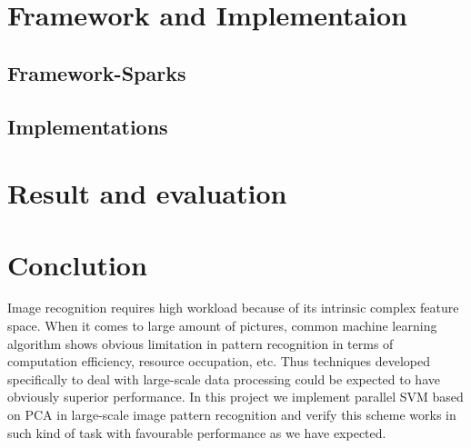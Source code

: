 \documentclass[a4paper]{article}
\begin{document}
\section{Framework and Implementaion}
\subsection{Framework-Sparks}
\subsection{Implementations}


\section{Result and evaluation}


\section{Conclution}
Image recognition requires high workload because of its intrinsic complex feature space. When it comes to large amount of pictures, common machine learning algorithm shows obvious limitation in pattern recognition in terms of computation efficiency, resource occupation, etc. Thus techniques developed specifically to deal with large-scale data processing could be expected to have obviously superior performance. In this project we implement parallel SVM based on PCA in large-scale image pattern recognition and verify this scheme works in such kind of task with favourable performance as we have expected. 
\end{document}

